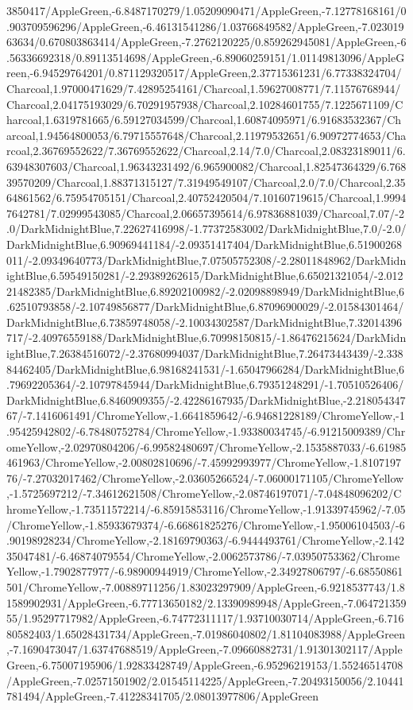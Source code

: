 {\begin{tikzternal}
3850417/AppleGreen,-6.8487170279/1.05209090471/AppleGreen,-7.12778168161/0.903709596296/AppleGreen,-6.46131541286/1.03766849582/AppleGreen,-7.02301963634/0.670803863414/AppleGreen,-7.2762120225/0.859262945081/AppleGreen,-6.56336692318/0.89113514698/AppleGreen,-6.89060259151/1.01149813096/AppleGreen,-6.94529764201/0.871129320517/AppleGreen,2.37715361231/6.77338324704/Charcoal,1.97000471629/7.42895254161/Charcoal,1.59627008771/7.11576768944/Charcoal,2.04175193029/6.70291957938/Charcoal,2.10284601755/7.1225671109/Charcoal,1.6319781665/6.59127034599/Charcoal,1.60874095971/6.91683532367/Charcoal,1.94564800053/6.79715557648/Charcoal,2.11979532651/6.90972774653/Charcoal,2.36769552622/7.36769552622/Charcoal,2.14/7.0/Charcoal,2.08323189011/6.63948307603/Charcoal,1.96343231492/6.965900082/Charcoal,1.82547364329/6.76839570209/Charcoal,1.88371315127/7.31949549107/Charcoal,2.0/7.0/Charcoal,2.3564861562/6.75954705151/Charcoal,2.40752420504/7.10160719615/Charcoal,1.99947642781/7.02999543085/Charcoal,2.06657395614/6.97836881039/Charcoal,7.07/-2.0/DarkMidnightBlue,7.22627416998/-1.77372583002/DarkMidnightBlue,7.0/-2.0/DarkMidnightBlue,6.90969441184/-2.09351417404/DarkMidnightBlue,6.51900268011/-2.09349640773/DarkMidnightBlue,7.07505752308/-2.28011848962/DarkMidnightBlue,6.59549150281/-2.29389262615/DarkMidnightBlue,6.65021321054/-2.01221482385/DarkMidnightBlue,6.89202100982/-2.02098898949/DarkMidnightBlue,6.62510793858/-2.10749856877/DarkMidnightBlue,6.87096900029/-2.01584301464/DarkMidnightBlue,6.73859748058/-2.10034302587/DarkMidnightBlue,7.32014396717/-2.40976559188/DarkMidnightBlue,6.70998150815/-1.86476215624/DarkMidnightBlue,7.26384516072/-2.37680994037/DarkMidnightBlue,7.26473443439/-2.33884462405/DarkMidnightBlue,6.98168241531/-1.65047966284/DarkMidnightBlue,6.79692205364/-2.10797845944/DarkMidnightBlue,6.79351248291/-1.70510526406/DarkMidnightBlue,6.8460909355/-2.42286167935/DarkMidnightBlue,-2.21805434767/-7.1416061491/ChromeYellow,-1.6641859642/-6.94681228189/ChromeYellow,-1.95425942802/-6.78480752784/ChromeYellow,-1.93380034745/-6.91215009389/ChromeYellow,-2.02970804206/-6.99582480697/ChromeYellow,-2.1535887033/-6.61985461963/ChromeYellow,-2.00802810696/-7.45992993977/ChromeYellow,-1.810719776/-7.27032017462/ChromeYellow,-2.03605266524/-7.06000171105/ChromeYellow,-1.5725697212/-7.34612621508/ChromeYellow,-2.08746197071/-7.04848096202/ChromeYellow,-1.73511572214/-6.85915853116/ChromeYellow,-1.91339745962/-7.05/ChromeYellow,-1.85933679374/-6.66861825276/ChromeYellow,-1.95006104503/-6.90198928234/ChromeYellow,-2.18169790363/-6.9444493761/ChromeYellow,-2.14235047481/-6.46874079554/ChromeYellow,-2.0062573786/-7.03950753362/ChromeYellow,-1.7902877977/-6.98900944919/ChromeYellow,-2.34927806797/-6.68550861501/ChromeYellow,-7.00889711256/1.83023297909/AppleGreen,-6.9218537743/1.81589902931/AppleGreen,-6.77713650182/2.13390989948/AppleGreen,-7.06472135955/1.95297717982/AppleGreen,-6.74772311117/1.93710030714/AppleGreen,-6.71680582403/1.65028431734/AppleGreen,-7.01986040802/1.81104083988/AppleGreen,-7.1690473047/1.63747688519/AppleGreen,-7.09660882731/1.91301302117/AppleGreen,-6.75007195906/1.92833428749/AppleGreen,-6.95296219153/1.55246514708/AppleGreen,-7.02571501902/2.01545114225/AppleGreen,-7.20493150056/2.10441781494/AppleGreen,-7.41228341705/2.08013977806/AppleGreen
\end{tikzternal}}
